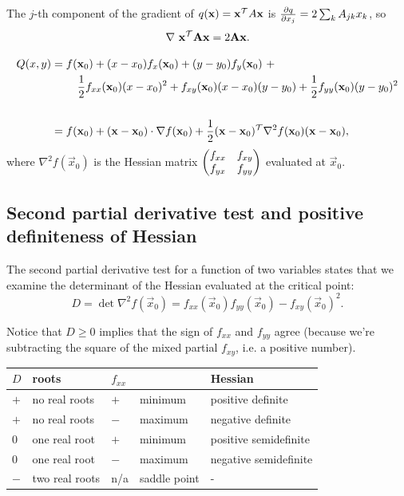 The $j$-th component of the gradient of $q(\mathbf x) = \mathbf x^\mathcal T A \mathbf x$ is
$\frac{\partial q}{\partial x_j} = 2\sum_k A_{jk}x_k$, so
\begin{align*}
  \nabla ~\mathbf x^\mathcal T \mathbf A \mathbf x = 2\mathbf A \mathbf x.
\end{align*}

\begin{align*}
Q(x, y) &=
f(\mathbf x_0) + (x - x_0)f_x(\mathbf x_0) +
(y - y_0)f_y(\mathbf x_0) ~+ \\
&~~~~~~~\frac{1}{2} f_{xx}(\mathbf x_0)(x - x_0)^2 +
f_{xy}(\mathbf x_0)(x - x_0)(y - y_0) +
\frac{1}{2} f_{yy}(\mathbf x_0)(y - y_0)^2 \\\\
&= f(\mathbf x_0) +
(\mathbf x - \mathbf x_0) \cdot \nabla f(\mathbf x_0) +
\frac{1}{2}(\mathbf x - \mathbf x_0)^\mathcal T \nabla^2 f(\mathbf x_0)(\mathbf x - \mathbf x_0),
\end{align*}
where $\nabla^2 f(\vec x_0)$ is the Hessian matrix $\begin{pmatrix}f_{xx} & f_{xy}\\f_{yx} & f_{yy}\\ \end{pmatrix}$ evaluated at $\vec x_0$.

\subsection{Second partial derivative test and positive definiteness of Hessian}

The second partial derivative test for a function of two variables states that
we examine the determinant of the Hessian evaluated at the critical point:
$$
D = \det \nabla^2 f(\vec x_0) = f_{xx}(\vec x_0)f_{yy}(\vec x_0) - f_{xy}(\vec x_0)^2.
$$

Notice that $D \geq 0$ implies that the sign of $f_{xx}$ and $f_{yy}$ agree
(because we're subtracting the square of the mixed partial $f_{xy}$, i.e. a
positive number).

\begin{tabular}{ l l l l l }
  $D$    & roots          & $f_{xx}$ &  & Hessian \\
  \hline
  $+$    & no real roots  & $+$     & minimum        & positive definite \\
  $+$    & no real roots  & $-$     & maximum        & negative definite \\
  $0$    & one real root  & $+$     & minimum        & positive semidefinite \\
  $0$    & one real root  & $-$     & maximum        & negative semidefinite \\
  $-$    & two real roots & n/a     & saddle point   & - \\
\end{tabular}

